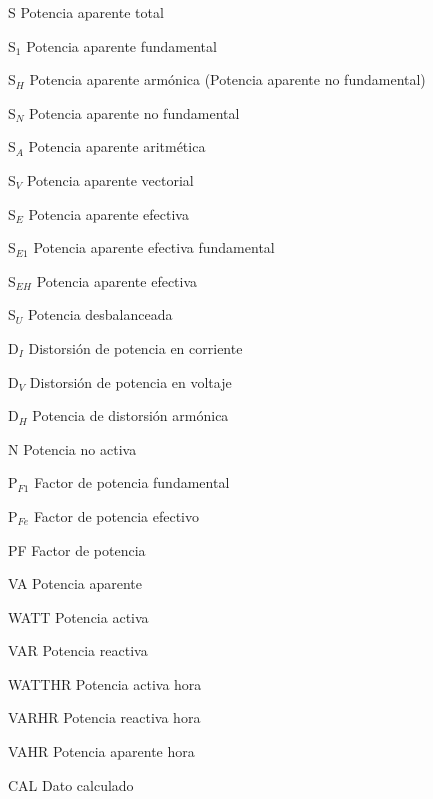 \begin{abbrv}
\item[S]			Potencia aparente total
\item[S$_{1}$]		Potencia aparente fundamental
\item[S$_{H}$]		Potencia aparente armónica (Potencia aparente no fundamental)

\item[S$_{N}$]		Potencia aparente no fundamental
\item[S$_{A}$]      Potencia aparente aritmética
\item[S$_{V}$]      Potencia aparente vectorial
\item[S$_{E}$]      Potencia aparente efectiva
\item[S$_{E1}$]      Potencia aparente efectiva fundamental
\item[S$_{EH}$]      Potencia aparente efectiva 
\item[S$_{U}$]      Potencia desbalanceada
\item[D$_{I}$]		Distorsión de potencia en corriente
\item[D$_{V}$]		Distorsión de potencia en voltaje
\item[D$_{H}$]		Potencia de distorsión armónica

\item[N]			Potencia no activa

\item[P$_{F1}$]		Factor de potencia fundamental
\item[P$_{Fe}$]		Factor de potencia efectivo
\item[PF]			Factor de potencia
\item[VA]           Potencia aparente
\item[WATT]         Potencia activa
\item[VAR]          Potencia reactiva   
\item[WATTHR]       Potencia activa hora
\item[VARHR]        Potencia reactiva hora
\item[VAHR]         Potencia aparente hora
\item[CAL]          Dato calculado

\end{abbrv}


\newpage{\clearpage}
\tableofcontents

\newpage{\clearpage}
%
\setcounter{page}{2}




% 

\newpage{\clearpage}

\nocite{*} 

\newpage{\clearpage}

